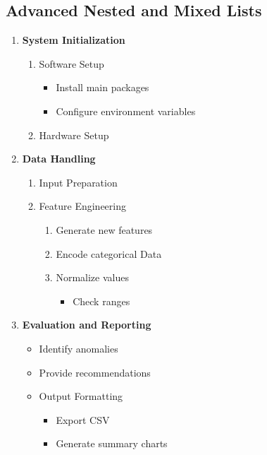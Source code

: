 \documentclass{article}
\begin{document}
\subsection{Advanced Nested and Mixed Lists}
\begin{enumerate}
    \item \textbf{System Initialization}
    \begin{enumerate}
        \item Software Setup
        \begin{itemize}
            \item[-] Install main packages
            \item[*] Configure environment variables
        \end{itemize}
        \item Hardware Setup
    \end{enumerate}
    \item \textbf{Data Handling}
    \begin{enumerate}
        \item Input Preparation
        \item Feature Engineering
        \begin{enumerate}[label=\roman*. \alph*)]
            \item Generate new features
\clearpage
            \item Encode categorical Data
            \item Normalize values
            \begin{itemize}
                \item [-] Check ranges
            \end{itemize}
        \end{enumerate}
    \end{enumerate}
    \item \textbf{Evaluation and Reporting}
    \begin{itemize}
        \item [*] Identify anomalies
        \item [+] Provide recommendations
        \item Output Formatting
        \begin{itemize}
            \item [*] Export CSV
            \item [-] Generate summary charts
        \end{itemize}
    \end{itemize}
\end{enumerate}
\end{document}
